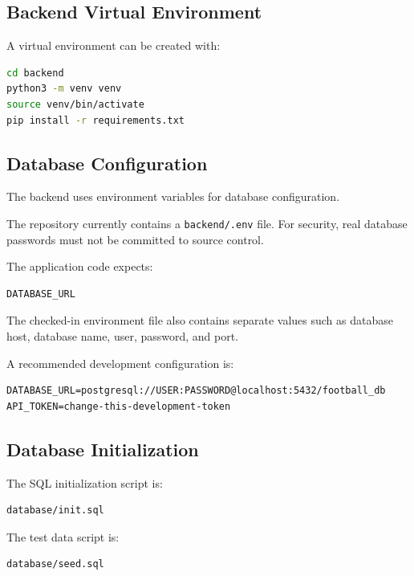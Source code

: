 \documentclass[12pt,a4paper]{article}
\begin{document}
\subsection{Backend Virtual Environment}

A virtual environment can be created with:

\begin{lstlisting}[language=bash]
cd backend
python3 -m venv venv
source venv/bin/activate
pip install -r requirements.txt
\end{lstlisting}

\subsection{Database Configuration}

The backend uses environment variables for database configuration.

The repository currently contains a \texttt{backend/.env} file.
For security, real database passwords must not be committed to source
control.

The application code expects:

\begin{lstlisting}
DATABASE_URL
\end{lstlisting}

The checked-in environment file also contains separate values such as
database host, database name, user, password, and port.

A recommended development configuration is:

\begin{lstlisting}
DATABASE_URL=postgresql://USER:PASSWORD@localhost:5432/football_db
API_TOKEN=change-this-development-token
\end{lstlisting}

\subsection{Database Initialization}

The SQL initialization script is:

\begin{lstlisting}
database/init.sql
\end{lstlisting}

The test data script is:

\begin{lstlisting}
database/seed.sql
\end{lstlisting}
\end{document}
